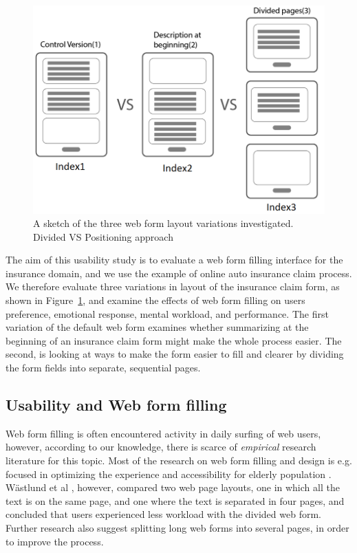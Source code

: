 \documentclass[../main/Feedback.tex]{subfiles}
\begin{document}
\begin{figure} [h]
	\centering
	\includegraphics[width=\linewidth]{../figures/layout-variations}
	\caption{A sketch of the three web form layout variations investigated. Divided VS Positioning approach}
	\label{fig:layout-variations}
\end{figure}

The aim of this usability study is to evaluate a web form filling interface for the insurance domain, and we use the example of online auto insurance claim process.
We therefore evaluate three variations in layout of the insurance claim form, as shown in Figure~\ref{fig:layout-variations}, and examine the effects of web form filling on users preference, emotional response, mental workload, and performance.
The first variation of the default web form examines whether summarizing at the beginning of an insurance claim form might make the whole process easier.
The second, is looking at ways to make the form easier to fill and clearer by dividing the form fields into separate, sequential pages.


\subsection{Usability and Web form filling}	
Web form filling is often encountered activity in daily surfing of web users, however, according to our knowledge, there is scarce of \emph{empirical} research literature for this topic.
Most of the research on web form filling and design is e.g. focused in optimizing the experience and accessibility for elderly population \cite{sayago2012selective,chadwick2003web,lines2006online,sayago2007some}.
W{\"a}stlund et al \cite{Wastlund20081229}, however, compared two web page layouts, one in which all the text is on the same page, and one where the text is separated in four pages, and concluded that users experienced less workload with the divided web form.
Further research \cite{jarrett2009forms,wroblewski2008web} also suggest splitting long web forms into several pages, in order to improve the process.
\end{document}
